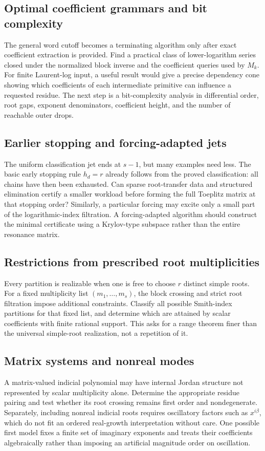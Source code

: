 \documentclass[11pt,a4paper]{article}
\numberwithin{equation}{section}
\theoremstyle{definition}
\theoremstyle{remark}
\theoremstyle{definition}
\begin{document}
\subsection{Optimal coefficient grammars and bit complexity}
The general word cutoff becomes a terminating algorithm only after exact coefficient extraction is provided. Find a practical class of lower-logarithm series closed under the normalized block inverse and the coefficient queries used by $M_k$. For finite Laurent-log input, a useful result would give a precise dependency cone showing which coefficients of each intermediate primitive can influence a requested residue. The next step is a bit-complexity analysis in differential order, root gaps, exponent denominators, coefficient height, and the number of reachable outer drops.

\subsection{Earlier stopping and forcing-adapted jets}
The uniform classification jet ends at $s-1$, but many examples need less. The basic early stopping rule $h_d=r$ already follows from the proved classification: all chains have then been exhausted. Can sparse root-transfer data and structured elimination certify a smaller workload before forming the full Toeplitz matrix at that stopping order? Similarly, a particular forcing may excite only a small part of the logarithmic-index filtration. A forcing-adapted algorithm should construct the minimal certificate using a Krylov-type subspace rather than the entire resonance matrix.

\subsection{Restrictions from prescribed root multiplicities}
Every partition is realizable when one is free to choose $r$ distinct simple roots. For a fixed multiplicity list $(m_1,\ldots,m_s)$, the block crossing and strict root filtration impose additional constraints. Classify all possible Smith-index partitions for that fixed list, and determine which are attained by scalar coefficients with finite rational support. This asks for a range theorem finer than the universal simple-root realization, not a repetition of it.

\subsection{Matrix systems and nonreal modes}
A matrix-valued indicial polynomial may have internal Jordan structure not represented by scalar multiplicity alone. Determine the appropriate residue pairing and test whether its root crossing remains first order and nondegenerate. Separately, including nonreal indicial roots requires oscillatory factors such as $x^{i\beta}$, which do not fit an ordered real-growth interpretation without care. One possible first model fixes a finite set of imaginary exponents and treats their coefficients algebraically rather than imposing an artificial magnitude order on oscillation.
\end{document}
